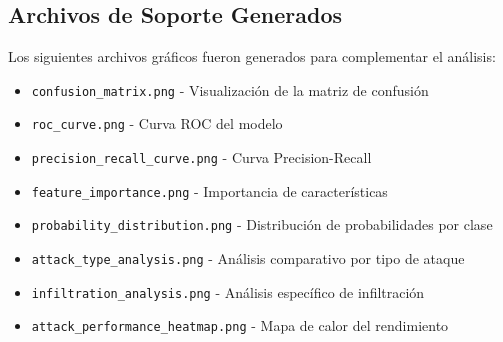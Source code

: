 \subsection{Archivos de Soporte Generados}

Los siguientes archivos gráficos fueron generados para complementar el análisis:

\begin{itemize}
\item \texttt{confusion\_matrix.png} - Visualización de la matriz de confusión
\item \texttt{roc\_curve.png} - Curva ROC del modelo
\item \texttt{precision\_recall\_curve.png} - Curva Precision-Recall
\item \texttt{feature\_importance.png} - Importancia de características
\item \texttt{probability\_distribution.png} - Distribución de probabilidades por clase
\item \texttt{attack\_type\_analysis.png} - Análisis comparativo por tipo de ataque
\item \texttt{infiltration\_analysis.png} - Análisis específico de infiltración
\item \texttt{attack\_performance\_heatmap.png} - Mapa de calor del rendimiento
\end{itemize}